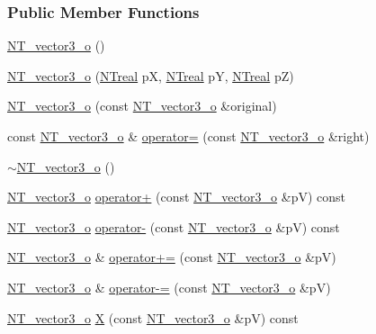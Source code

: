 \subsubsection*{Public Member Functions}
\begin{DoxyCompactItemize}
\item 
\hyperlink{class_n_t__vector3__o_a615008ab2fd53526ac8928c2c29a191c}{NT\_\-vector3\_\-o} ()
\item 
\hyperlink{class_n_t__vector3__o_a9f51d8f7982a765ad965f0ab4e9b90c5}{NT\_\-vector3\_\-o} (\hyperlink{nt__types_8h_a814a97893e9deb1eedcc7604529ba80d}{NTreal} pX, \hyperlink{nt__types_8h_a814a97893e9deb1eedcc7604529ba80d}{NTreal} pY, \hyperlink{nt__types_8h_a814a97893e9deb1eedcc7604529ba80d}{NTreal} pZ)
\item 
\hyperlink{class_n_t__vector3__o_a0cfdc26eead717bb2dae73f057aa2635}{NT\_\-vector3\_\-o} (const \hyperlink{class_n_t__vector3__o}{NT\_\-vector3\_\-o} \&original)
\item 
const \hyperlink{class_n_t__vector3__o}{NT\_\-vector3\_\-o} \& \hyperlink{class_n_t__vector3__o_a19bda11578b582155a135ac5bc018b75}{operator=} (const \hyperlink{class_n_t__vector3__o}{NT\_\-vector3\_\-o} \&right)
\item 
\hyperlink{class_n_t__vector3__o_aa3e98a667f9edd30974dae55c3fb92e6}{$\sim$NT\_\-vector3\_\-o} ()
\item 
\hyperlink{class_n_t__vector3__o}{NT\_\-vector3\_\-o} \hyperlink{class_n_t__vector3__o_a812b6e1f0804d6b67ace5079a7fe0373}{operator+} (const \hyperlink{class_n_t__vector3__o}{NT\_\-vector3\_\-o} \&pV) const 
\item 
\hyperlink{class_n_t__vector3__o}{NT\_\-vector3\_\-o} \hyperlink{class_n_t__vector3__o_a0ec10920c95cbc0cab357fd8331b6dc6}{operator-\/} (const \hyperlink{class_n_t__vector3__o}{NT\_\-vector3\_\-o} \&pV) const 
\item 
\hyperlink{class_n_t__vector3__o}{NT\_\-vector3\_\-o} \& \hyperlink{class_n_t__vector3__o_a6ec6f8a3b7383dad31048375f31dd471}{operator+=} (const \hyperlink{class_n_t__vector3__o}{NT\_\-vector3\_\-o} \&pV)
\item 
\hyperlink{class_n_t__vector3__o}{NT\_\-vector3\_\-o} \& \hyperlink{class_n_t__vector3__o_aaf5ff1927056b91af9f2412807c43074}{operator-\/=} (const \hyperlink{class_n_t__vector3__o}{NT\_\-vector3\_\-o} \&pV)
\item 
\hyperlink{class_n_t__vector3__o}{NT\_\-vector3\_\-o} \hyperlink{class_n_t__vector3__o_a3e2853290fed86c70b8f6ef4964a482e}{X} (const \hyperlink{class_n_t__vector3__o}{NT\_\-vector3\_\-o} \&pV) const 

\end{DoxyCompactItemize}
